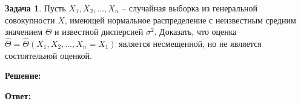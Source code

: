 \documentclass[a4paper,12pt]{article}
\theoremstyle{definition}
\newtheorem{problem}{Задача}\setlength{\parindent}{0pt}
\newenvironment{solution}
{\begin{shaded}\textbf{Решение:}\par\setlength{\parindent}{0pt}}
{\end{shaded}}
\newenvironment{answer}
{\par\noindent\textbf{Ответ:}}
{\par}
\begin{document}
\vspace{8pt}
\begin{problem}
    Пусть \(X_1,X_2, ... ,X_n\) – случайная выборка из генеральной совокупности \(X\), 
    имеющей нормальное распределение с неизвестным средним значением \( \Theta \) 
    и известной дисперсией \( \sigma ^ 2\). Доказать, что оценка 
    \( \hat\Theta = \hat\Theta (X_1,X_2, ... ,X_n = X_1) \) является несмещенной, 
    но не является состоятельной оценкой.

    \begin{solution}
    \end{solution}

    \begin{answer}
    \end{answer}

\end{problem}
\end{document}
